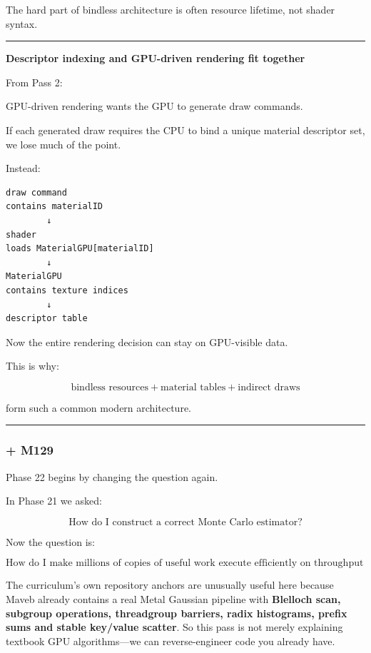 The hard part of bindless architecture is often resource lifetime, not shader syntax.

\begin{center}\rule{0.5\linewidth}{0.5pt}\end{center}

\textbf{Descriptor indexing and GPU-driven rendering fit together}

From Pass 2:

GPU-driven rendering wants the GPU to generate draw commands.

If each generated draw requires the CPU to bind a unique material descriptor set, we lose much of the point.

Instead:

\begin{verbatim}
draw command
contains materialID
        ↓
shader
loads MaterialGPU[materialID]
        ↓
MaterialGPU
contains texture indices
        ↓
descriptor table
\end{verbatim}

Now the entire rendering decision can stay on GPU-visible data.

This is why:

\[
\boxed{
\text{bindless resources}
+
\text{material tables}
+
\text{indirect draws}
}
\]

form such a common modern architecture.

\begin{center}\rule{0.5\linewidth}{0.5pt}\end{center}

\subsubsection{+ M129}\label{m129}

Phase 22 begins by changing the question again.

In Phase 21 we asked:

\[
\boxed{\text{How do I construct a correct Monte Carlo estimator?}}
\]

Now the question is:

\[
\boxed{\text{How do I make millions of copies of useful work execute efficiently on throughput hardware?}}
\]

The curriculum's own repository anchors are unusually useful here because Maveb already contains a real Metal Gaussian pipeline with \textbf{Blelloch scan, subgroup operations, threadgroup barriers, radix histograms, prefix sums and stable key/value scatter}. So this pass is not merely explaining textbook GPU algorithms---we can reverse-engineer code you already have.

